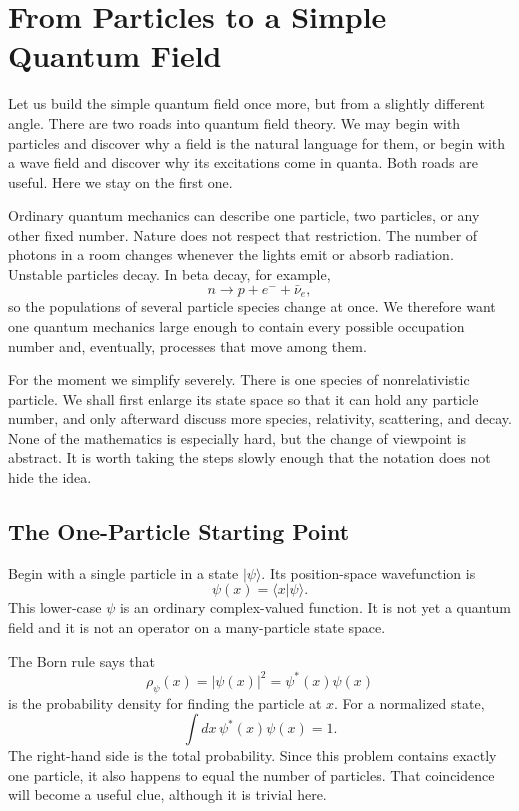 \chapter{From Particles to a Simple Quantum Field}

Let us build the simple quantum field once more, but from a slightly different angle. There are two roads into quantum field theory. We may begin with particles and discover why a field is the natural language for them, or begin with a wave field and discover why its excitations come in quanta. Both roads are useful. Here we stay on the first one.

Ordinary quantum mechanics can describe one particle, two particles, or any other fixed number. Nature does not respect that restriction. The number of photons in a room changes whenever the lights emit or absorb radiation. Unstable particles decay. In beta decay, for example,
\begin{equation}
n\longrightarrow p+e^-+\bar{\nu}_e,
\end{equation}
so the populations of several particle species change at once. We therefore want one quantum mechanics large enough to contain every possible occupation number and, eventually, processes that move among them.

For the moment we simplify severely. There is one species of nonrelativistic particle. We shall first enlarge its state space so that it can hold any particle number, and only afterward discuss more species, relativity, scattering, and decay. None of the mathematics is especially hard, but the change of viewpoint is abstract. It is worth taking the steps slowly enough that the notation does not hide the idea.

\section{The One-Particle Starting Point}

Begin with a single particle in a state \(|\psi\rangle\). Its position-space wavefunction is
\begin{equation}
\psi(x)=\langle x|\psi\rangle.
\label{eq:l07-wavefunction}
\end{equation}
This lower-case \(\psi\) is an ordinary complex-valued function. It is not yet a quantum field and it is not an operator on a many-particle state space.

The Born rule says that
\begin{equation}
\rho_\psi(x)=|\psi(x)|^2=\psi^*(x)\psi(x)
\label{eq:l07-born-density}
\end{equation}
is the probability density for finding the particle at \(x\). For a normalized state,
\begin{equation}
\int dx\,\psi^*(x)\psi(x)=1.
\label{eq:l07-one-particle-normalization}
\end{equation}
The right-hand side is the total probability. Since this problem contains exactly one particle, it also happens to equal the number of particles. That coincidence will become a useful clue, although it is trivial here.

